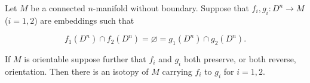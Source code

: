 Let $M$ be a connected $n$-manifold without boundary. Suppose that $f_i, g_i: D^n \to M$ ($i = 1, 2$) are embeddings such that

$$f_1(D^n) \cap f_2(D^n) = \varnothing = g_1(D^n) \cap g_2(D^n).$$

If $M$ is orientable suppose further that $f_i$ and $g_i$ both preserve, or both reverse, orientation. Then there is an isotopy of $M$ carrying $f_i$ to $g_i$ for $i = 1, 2$.
